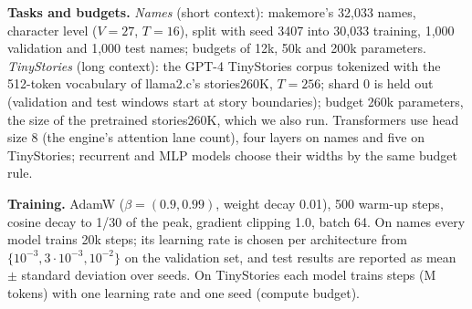\begin{table}[t]
\centering\footnotesize
\caption{Feature ladder: one change per step, equal parameter budget.}
\label{tab:ladder}
\end{table}

\textbf{Tasks and budgets.} \emph{Names} (short context): makemore's 32{,}033 names, character level ($V=27$, $T=16$),
split with seed 3407 into 30{,}033 training, 1{,}000 validation and 1{,}000 test names; budgets of 12k, 50k and 200k
parameters. \emph{TinyStories} (long context): the GPT-4 TinyStories corpus \cite{eldan2023tinystories} tokenized with the
512-token vocabulary of llama2.c's stories260K, $T=256$; shard 0 is held out (validation and test windows start at story
boundaries); budget 260k parameters, the size of the pretrained stories260K, which we also run. Transformers use head size 8
(the engine's attention lane count), four layers on names and five on TinyStories; recurrent and MLP models choose their
widths by the same budget rule.

\textbf{Training.} AdamW ($\beta=(0.9,0.99)$, weight decay 0.01), 500 warm-up steps, cosine decay to 1/30 of the peak,
gradient clipping 1.0, batch 64. On names every model trains 20k steps; its learning rate is chosen per architecture from
$\{10^{-3}, 3\cdot10^{-3}, 10^{-2}\}$ on the validation set, and test results are reported as mean $\pm$ standard deviation
over \zooNamesSeeds{} seeds. On TinyStories each model trains \zooStoriesSteps{} steps (\zooStoriesTokensM{}M tokens) with one
learning rate and one seed (compute budget).
